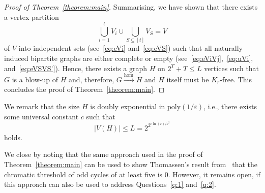 \documentclass[reqno, 12pt]{amsart}
\theoremstyle{plain}
\theoremstyle{definition}
\let\eps=\varepsilon
\begin{document}
\begin{proof}[Proof of Theorem~\ref{theorem:main}]
	Summarising, we have shown that there exists a vertex partition 
	\[
		\bigcup_{i=1}^tV_i\cup\bigcup_{S\subseteq [t]} V_S=V
	\]
	of $V$ into independent sets (see~\eqref{eq:eVi} and~\eqref{eq:eVS})
	such that all naturally induced bipartite graphs are either complete 
	or empty (see~\eqref{eq:eViVj},~\eqref{eq:uVi}, and~\eqref{eq:eVSVS'}). Hence, there exists 
	a graph $H$ on $2^T+T\leq L$ vertices such that $G$ is a blow-up of $H$ and, therefore,
	$G{\xrightarrow{\text{hom}\,}} H$ and $H$ itself must be $K_r$-free.
	This concludes the proof of Theorem~\ref{theorem:main}.
\end{proof}

We remark that the size $H$ is doubly exponential in $\textrm{poly}(1/\eps)$, i.e., there exists some 
universal constant $c$ such that
\[
	|V(H)|\leq L=2^{2^{c\ln(\eps)/\eps^2}}
\]
holds.

We close by noting that the same approach used in the proof of 
Theorem~\ref{theorem:main} can be used to show Thomassen's 
result from~\cite{T_C07} that the chromatic threshold of odd cycles 
of at least five is $0$. However, it remains open, if this approach 
can also be used to address Questions~\ref{q:1} and~\ref{q:2}.
\end{document}
